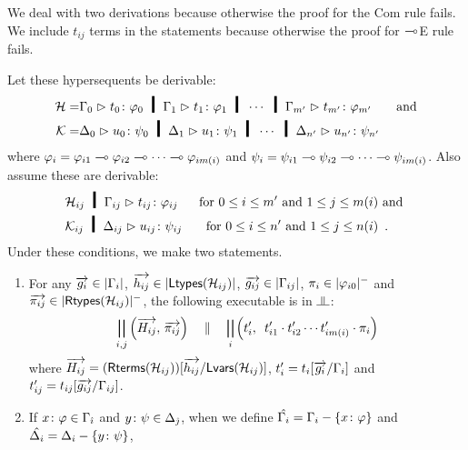 
We deal with two derivations because otherwise the proof for the
Com rule fails.
We include $t_{ij}$ terms in the statements because otherwise
the proof for $\multimap$E rule fails.

\begin{proposition}[Adequacy]
 Let these hypersequents be derivable:
 \begin{align*}
  \Hy = &\sequent{\G_0}{\tj{t_0}{\phi_0}} \hmid
  \sequent{\G_1}{\tj{t_1}{\phi_1}} \hmid \cdots \hmid
  \sequent{\G_{m'}}{\tj{t_{m'}}{\phi_{m'}}}
  &\text{ and}\\
  \Ky = &\sequent{\D_0}{\tj{u_0}{\psi_0}} \hmid
  \sequent{\D_1}{\tj{u_1}{\psi_1}} \hmid \cdots \hmid
  \sequent{\D_{n'}}{\tj{u_{n'}}{\psi_{n'}}}
 \end{align*}
where $\varphi_i = {\varphi_{i1}\multimap\varphi_{i2}\multimap\cdots\multimap\varphi_{im(i)}}$
and   $\psi_i = {\psi_{i1}\multimap\psi_{i2}\multimap\cdots\multimap\psi_{im(i)}}$.
 Also assume these are derivable:
 \begin{align*}
  & \Hy_{ij} \hmid \sequent{\G_{ij}}{\tj{t_{ij}}{\phi_{ij}}} &\text{ for
  } 0\le i\le m'\text{ and }1\le j\le m(i) &\text{ and }\\
  & \Ky_{ij} \hmid \sequent{\D_{ij}}{\tj{u_{ij}}{\psi_{ij}}} &\text{ for
  } 0\le i\le n'\text{ and }1\le j\le n(i)&\enspace .
 \end{align*}
 Under these conditions, we make two statements.
 \begin{enumerate}[label=(\arabic{*}), ref=\textit{(\arabic{*})}]
  \item \label{c:first}
	For any
	$\overrightarrow{g_i}         \in|{\Gamma_i}|$,
	$\overrightarrow{h_{ij}}      \in|{\mathsf{Ltypes}({\mathcal{H}_{ij}})}|$,
	$\overrightarrow{g_{ij}}      \in|{\Gamma_{ij}}|$,
	$\pi_i             \in|{\varphi_{i0}}|^-$ and
	$\overrightarrow{\pi_{ij}}    \in|{\mathsf{Rtypes}({\mathcal{H}_{ij}})}|^-$,
	the following executable is in $\bbot$:
	\[
	 \bigparallel_{i,j}\left(\overrightarrow{H_{ij}},\,
	\overrightarrow{\pi_{ij}}\right)\quad \parallel\quad
	\bigparallel_i\left(t_i',\,\,\,t'_{i1}\cdot t'_{i2}\cdots
	t'_{im(i)}\cdot \pi_i\right)
	\]
	where $
	 \overrightarrow{H_{ij}}=(\mathsf{Rterms}({\mathcal{H}_{ij}}))[\overrightarrow{h_{ij}}/\mathsf{Lvars}({\mathcal{H}_{ij}})]$,\quad
	$t'_i = t_i[\overrightarrow{g_i}/\Gamma_i]$ and\quad
	$t'_{ij} = t_{ij}[\overrightarrow{g_{ij}}/\Gamma_{ij}]$\enspace.
  \item \label{c:second}
	If ${x} \colon{\varphi}\in\Gamma_{\hat\imath}$ and
	${y} \colon{\psi}\in\Delta_{\hat\jmath}$,
	when we define $\hat{\Gamma_i} = \Gamma_i -\{{x} \colon{\varphi}\}$ and
	$\hat{\Delta_i} = \Delta_i -\{{y} \colon{\psi}\}$,

\end{enumerate}
\end{proposition}

